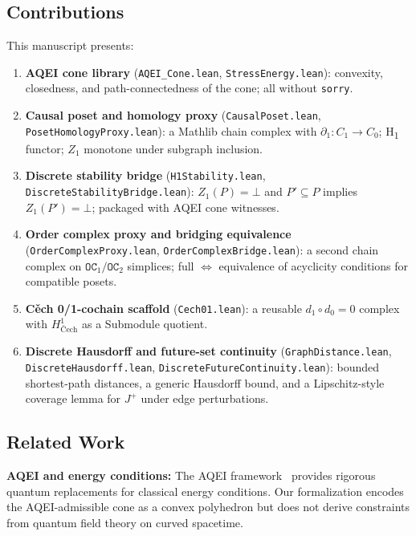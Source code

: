 \documentclass[12pt]{article}
\begin{document}
\subsection{Contributions}

This manuscript presents:

\begin{enumerate}
    \item \textbf{AQEI cone library} (\texttt{AQEI\_Cone.lean},
          \texttt{StressEnergy.lean}): convexity, closedness,
          and path-connectedness of the cone; all without \texttt{sorry}.
    \item \textbf{Causal poset and homology proxy}
          (\texttt{CausalPoset.lean}, \texttt{PosetHomologyProxy.lean}):
          a Mathlib chain complex with $\partial_1: C_1\to C_0$; H\textsubscript{1}
          functor; $Z_1$ monotone under subgraph inclusion.
    \item \textbf{Discrete stability bridge}
          (\texttt{H1Stability.lean}, \texttt{DiscreteStabilityBridge.lean}):
          $Z_1(P)=\bot$ and $P'\subseteq P$ implies $Z_1(P')=\bot$;
          packaged with AQEI cone witnesses.
    \item \textbf{Order complex proxy and bridging equivalence}
          (\texttt{OrderComplexProxy.lean}, \texttt{OrderComplexBridge.lean}):
          a second chain complex on $\texttt{OC}_1/\texttt{OC}_2$ simplices;
          full $\iff$ equivalence of acyclicity conditions for compatible posets.
    \item \textbf{C\v{e}ch 0/1-cochain scaffold} (\texttt{Cech01.lean}):
          a reusable $d_1\circ d_0=0$ complex with $H^1_{\text{\v{C}ech}}$
          as a Submodule quotient.
    \item \textbf{Discrete Hausdorff and future-set continuity}
          (\texttt{GraphDistance.lean}, \texttt{DiscreteHausdorff.lean},
           \texttt{DiscreteFutureContinuity.lean}): bounded shortest-path
          distances, a generic Hausdorff bound, and a Lipschitz-style coverage
          lemma for $J^+$ under edge perturbations.
\end{enumerate}

\subsection{Related Work}

\textbf{AQEI and energy conditions:} The AQEI framework~\cite{fewster2012averaged}
provides rigorous quantum replacements for classical energy conditions. Our
formalization encodes the AQEI-admissible cone as a convex polyhedron but does
not derive constraints from quantum field theory on curved spacetime.
\end{document}

